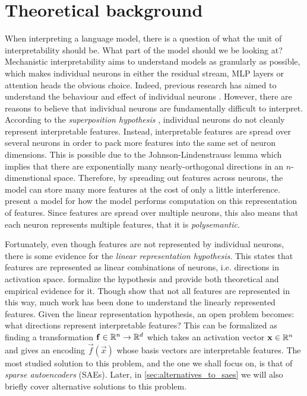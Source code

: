 \section{Theoretical background}
When interpreting a language model, there is a question of what the unit of interpretability should be.
What part of the model should we be looking at?
Mechanistic interpretability aims to understand models as granularly as possible, which makes individual neurons in either the residual stream, MLP layers or attention heads the obvious choice.
Indeed, previous research has aimed to understand the behaviour and effect of individual neurons \cite{foote_neuron_2023}\cite{bills_language_2023}.
However, there are reasons to believe that individual neurons are fundamentally difficult to interpret.
According to the \emph{superposition hypothesis} \cite{elhage_toy_2022}, individual neurons do not cleanly represent interpretable features.
Instead, interpretable features are spread over several neurons in order to pack more features into the same set of neuron dimensions.
This is possible due to the Johnson-Lindenstrauss lemma which implies that there are exponentially many nearly-orthogonal directions in an $n$-dimenstional space.
Therefore, by spreading out features across neurons, the model can store many more features at the cost of only a little interference.
\cite{vaintrob_toward_2024} present a model for how the model performs computation on this representation of features.
Since features are spread over multiple neurons, this also means that each neuron represents multiple features, that it is \emph{polysemantic}.

Fortunately, even though features are not represented by individual neurons, there is some evidence for the \emph{linear representation hypothesis}.
This states that features are represented as linear combinations of neurons, i.e. directions in activation space.
\cite{park_linear_2023} formalize the hypothesis and provide both theoretical and empirical evidence for it.
Though \cite{engels_not_2024} show that not all features are represented in this way, much work has been done to understand the linearly represented features.
Given the linear representation hypothesis, an open problem becomes: what directions represent interpretable features?
This can be formalized as finding a transformation $\mathbf{f}\in\mathbb{R}^n\to\mathbb{R}^d$ which takes an activation vector $\mathbf{x}\in\mathbb{R}^n$ and gives an encoding $\vec f(\vec x)$ whose basis vectors are interpretable features.
The most studied solution to this problem, and the one we shall focus on, is that of \emph{sparse autoencoders} (SAEs).
Later, in \ref{sec:alternatives_to_saes} we will also briefly cover alternative solutions to this problem.


